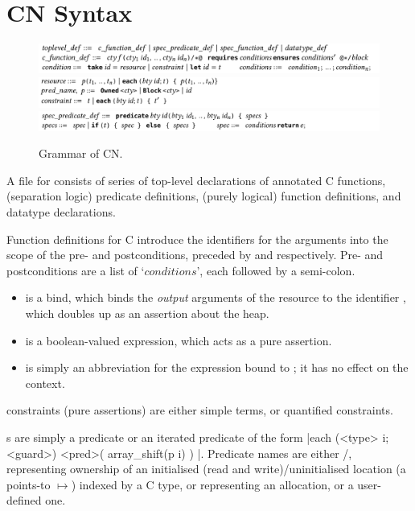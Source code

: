 \section{CN Syntax}%

\begin{figure}[tp]
    \centering
    \includegraphics{figures/cn-grammar-1}
    \includegraphics{figures/cn-grammar-2}
    \includegraphics{figures/cn-grammar-3}
    \caption{Grammar of CN.}\label{fig:cn-grammar}
\end{figure}

A file for  consists of series of top-level declarations of annotated C
functions, (separation logic) predicate definitions, (purely logical) function
definitions, and datatype declarations.

Function definitions for C introduce the identifiers for the arguments into the
scope of the pre- and postconditions, preceded by  and
 respectively. Pre- and postconditions are a list of
`${conditions}$', each followed by a semi-colon.
\begin{itemize}
    \item {} is a  bind, which binds
        the \emph{output} arguments of the resource to the identifier ,
        which doubles up as an assertion about the heap.
    \item {} is a boolean-valued expression, which acts as a
        pure assertion.
    \item {} is simply an abbreviation for the expression
         bound to ; it has no effect on the context.
\end{itemize}

 constraints (pure assertions) are either simple terms, or quantified
constraints.

 s are simply a predicate  %
or an iterated predicate of the form
\cninline[breaklines]|each (<type> i; <guard>) { <pred>( array_shift(p i) ) }|. %
Predicate names  are either
/, representing ownership of an
initialised (read and write)/uninitialised location (a points-to $\mapsto{}$)
indexed by a C type, or  representing an allocation, or a
user-defined one.

